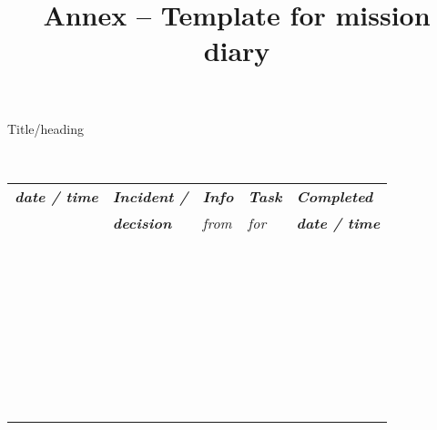 \documentclass{article}
\begin{document}
\title{Annex – Template for mission diary}

\maketitle





Title/heading


 


\begin{tabu} to \textwidth { |X|X|X|X|X| }
\hline



\emph{\textbf{date / time}} & \emph{\textbf{Incident /}} & \emph{\textbf{Info}} & \emph{\textbf{Task}} & \emph{\textbf{Completed}}
 \\


 & \emph{\textbf{decision}} & \emph{from} & \emph{for} & \emph{\textbf{date / time}}
 \\


  &   &   &   & 
 \\


  &   &   &   &  
 \\


  &   &   &   &  
 \\


  &   &   &   &  
 \\


  &   &   &   &  
 \\


  &   &   &   &  
 \\


  &   &   &   &  
 \\
\hline

\end{tabu}
\end{document}
